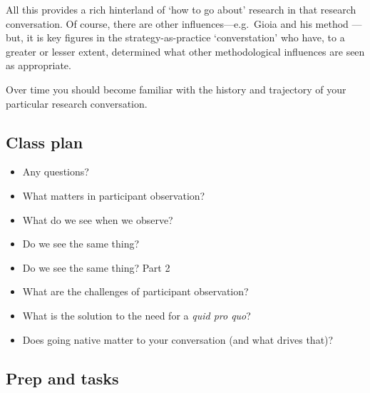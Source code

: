 \documentclass[]{book}
\theoremstyle{definition}
\theoremstyle{definition}
\theoremstyle{definition}
\theoremstyle{remark}
\begin{document}
All this provides a rich hinterland of `how to go about' research in
that research conversation. Of course, there are other
influences---e.g.~Gioia and his method
\autocite{gioia_2013_seekingqualitativerigor}---but, it is key figures
in the strategy-as-practice `converstation' who have, to a greater or
lesser extent, determined what other methodological influences are seen
as appropriate.

Over time you should become familiar with the history and trajectory of
your particular research conversation.

\hypertarget{class-plan-3}{%
\subsection*{Class plan}\label{class-plan-3}}

\begin{itemize}
\item
  Any questions?
\item
  What matters in participant observation?
\item
  What do we see when we observe?
\item
  Do we see the same thing?
\item
  Do we see the same thing? Part 2
\item
  What are the challenges of participant observation?
\item
  What is the solution to the need for a \emph{quid pro quo}?
\item
  Does going native matter to your conversation (and what drives that)?
\end{itemize}

\hypertarget{prep-and-tasks-3}{%
\subsection*{Prep and tasks}\label{prep-and-tasks-3}}
\end{document}
